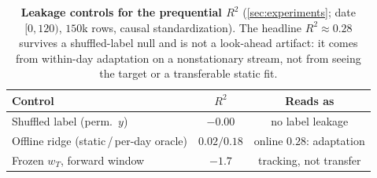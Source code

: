 \documentclass{article}
\begin{document}
\begin{table}[htbp]
\caption{\textbf{Leakage controls for the prequential $R^2$} (\cref{sec:experiments};
date$[0,120)$, $150$k rows, causal standardization). The headline $R^2\approx0.28$ survives a shuffled-label null and is
not a look-ahead artifact: it comes from within-day adaptation on a nonstationary stream, not
from seeing the target or a transferable static fit.}
\label{tab:leakage}
\centering
\begin{small}
\begin{tabular}{lcc}
\toprule
Control & $R^2$ & Reads as \\
\midrule
Shuffled label (perm.\ $y$)               & $-0.00$     & no label leakage \\
Offline ridge (static\,/\,per-day oracle) & $0.02/0.18$ & online $0.28$: adaptation \\
Frozen $w_T$, forward window              & $-1.7$      & tracking, not transfer \\
\bottomrule
\end{tabular}
\end{small}
\end{table}
\end{document}
